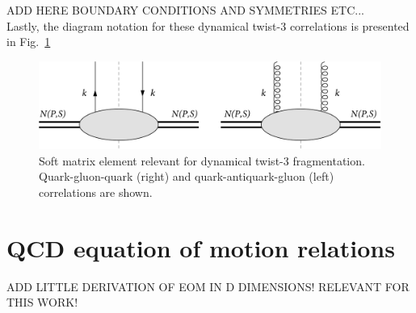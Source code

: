 ADD HERE BOUNDARY CONDITIONS AND SYMMETRIES ETC...\\

Lastly, the diagram notation for these dynamical twist-3 correlations is presented in Fig.~\ref{fig:fragmentation corr D}
\begin{figure}[h]
    \centering
    \includegraphics[width=0.8\linewidth]{fig/phi corr.png}
    \caption{Soft matrix element relevant for dynamical twist-3 fragmentation. Quark-gluon-quark (right) and quark-antiquark-gluon (left) correlations are shown.}
    \label{fig:fragmentation corr D}
\end{figure}



\section{QCD equation of motion relations}
\noindent ADD LITTLE DERIVATION OF EOM IN D DIMENSIONS! RELEVANT FOR THIS WORK!\\

